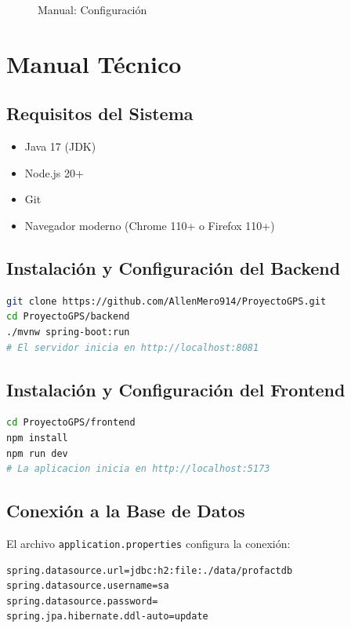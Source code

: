 \documentclass[12pt, letterpaper]{report}
\begin{document}
\begin{figure}[H]
\centering
{}
\caption{Manual: Configuración}
\end{figure}

\chapter{Manual Técnico}

\section*{Requisitos del Sistema}
\begin{itemize}
    \item Java 17 (JDK)
    \item Node.js 20+
    \item Git
    \item Navegador moderno (Chrome 110+ o Firefox 110+)
\end{itemize}

\section*{Instalación y Configuración del Backend}
\begin{lstlisting}[language=bash,caption={Instalación del backend}]
git clone https://github.com/AllenMero914/ProyectoGPS.git
cd ProyectoGPS/backend
./mvnw spring-boot:run
# El servidor inicia en http://localhost:8081
\end{lstlisting}

\section*{Instalación y Configuración del Frontend}
\begin{lstlisting}[language=bash,caption={Instalación del frontend}]
cd ProyectoGPS/frontend
npm install
npm run dev
# La aplicacion inicia en http://localhost:5173
\end{lstlisting}

\section*{Conexión a la Base de Datos}
El archivo \texttt{application.properties} configura la conexión:
\begin{lstlisting}[language={},caption={Configuración de base de datos}]
spring.datasource.url=jdbc:h2:file:./data/profactdb
spring.datasource.username=sa
spring.datasource.password=
spring.jpa.hibernate.ddl-auto=update
\end{lstlisting}
\end{document}
